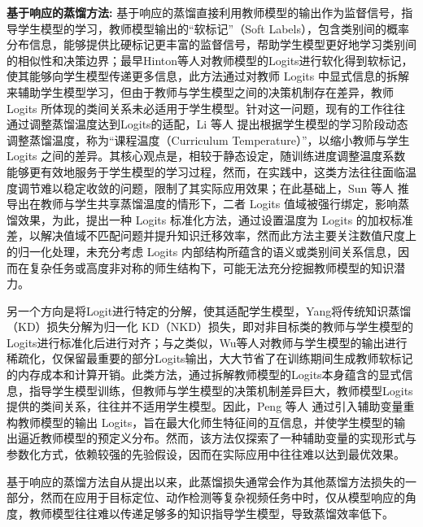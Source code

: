 \documentclass[10.5pt,letterpaper]{article}
\begin{document}
\textbf{基于响应的蒸馏方法:}
基于响应的蒸馏直接利用教师模型的输出作为监督信号，指导学生模型的学习，教师模型输出的“软标记”（Soft Labels），包含类别间的概率分布信息，能够提供比硬标记更丰富的监督信号，帮助学生模型更好地学习类别间的相似性和决策边界；最早Hinton等人\cite{geoffrey-arxiv2015-kd}对教师模型的Logits进行软化得到软标记，使其能够向学生模型传递更多信息，此方法通过对教师 Logits 中显式信息的拆解来辅助学生模型学习，但由于教师与学生模型之间的决策机制存在差异，教师 Logits 所体现的类间关系未必适用于学生模型。针对这一问题，现有的工作往往通过调整蒸馏温度达到Logits的适配，Li 等人 \cite{li-aaai2023-ctkd} 提出根据学生模型的学习阶段动态调整蒸馏温度，称为“课程温度（Curriculum Temperature）”，以缩小教师与学生 Logits 之间的差异。其核心观点是，相较于静态设定，随训练进度调整温度系数能够更有效地服务于学生模型的学习过程，然而，在实践中，这类方法往往面临温度调节难以稳定收敛的问题，限制了其实际应用效果；在此基础上，Sun 等人 \cite{sun-cvpr2024-lskd} 推导出在教师与学生共享蒸馏温度的情形下，二者 Logits 值域被强行绑定，影响蒸馏效果，为此，提出一种 Logits 标准化方法，通过设置温度为 Logits 的加权标准差，以解决值域不匹配问题并提升知识迁移效率，然而此方法主要关注数值尺度上的归一化处理，未充分考虑 Logits 内部结构所蕴含的语义或类别间关系信息，因而在复杂任务或高度非对称的师生结构下，可能无法充分挖掘教师模型的知识潜力。

另一个方向是将Logit进行特定的分解，使其适配学生模型，Yang\cite{Yang-iccv2023-unifiedkd}将传统知识蒸馏（KD）损失分解为归一化 KD（NKD）损失，即对非目标类的教师与学生模型的Logits进行标准化后进行对齐；与之类似，Wu等人\cite{wu-eccv2022-tinyvit}对教师与学生模型的输出进行稀疏化，仅保留最重要的部分Logits输出，大大节省了在训练期间生成教师软标记的内存成本和计算开销。此类方法，通过拆解教师模型的Logits本身蕴含的显式信息，指导学生模型训练，但教师与学生模型的决策机制差异巨大，教师模型Logits提供的类间关系，往往并不适用学生模型。因此，Peng 等人 \cite{peng-icml2024-auxkd} 通过引入辅助变量重构教师模型的输出 Logits，旨在最大化师生特征间的互信息，并使学生模型的输出逼近教师模型的预定义分布。然而，该方法仅探索了一种辅助变量的实现形式与参数化方式，依赖较强的先验假设，因而在实际应用中往往难以达到最优效果。


基于响应的蒸馏方法自从提出以来，此蒸馏损失通常会作为其他蒸馏方法损失的一部分，然而在应用于目标定位、动作检测等复杂视频任务中时，仅从模型响应的角度，教师模型往往难以传递足够多的知识指导学生模型，导致蒸馏效率低下。
\end{document}
